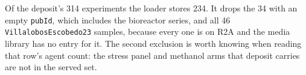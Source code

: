  Of the deposit's 314 
experiments the loader stores 234. It drops the 34 with an empty \texttt{pubId}, which
includes the bioreactor series, and all 46 \texttt{VillalobosEscobedo23} samples,
because every one is on R2A and the media library has no entry for it. The second
exclusion is worth knowing when reading that row's agent count: the stress panel and
methanol arms that deposit carries are not in the served set.
